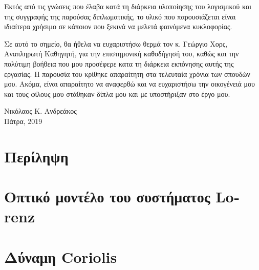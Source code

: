 \documentclass[12pt, a4paper, oneside]{article}
\numberwithin{equation}{subsection}
\def\lat#1{\textlatin{#1}}
\begin{document}
		Εκτός από τις γνώσεις που έλαβα κατά τη διάρκεια υλοποίησης του λογισμικού και της συγγραφής της παρούσας διπλωματικής, το υλικό που παρουσιάζεται είναι ιδιαίτερα χρήσιμο σε κάποιον που ξεκινά να μελετά φαινόμενα κυκλοφορίας.

		Σε αυτό το σημείο, θα ήθελα να ευχαριστήσω θερμά τον κ. Γεώργιο Χορς, Αναπληρωτή Καθηγητή, για την επιστημονική καθοδήγησή του, καθώς και την πολύτιμη βοήθεια που μου προσέφερε κατα τη διάρκεια εκπόνησης αυτής της εργασίας. Η παρουσία του κρίθηκε απαραίτητη στα τελευταία χρόνια των σπουδών μου. Ακόμα, είναι απαραίτητο να αναφερθώ και να ευχαριστήσω την οικογένειά μου και τους φίλους μου στάθηκαν δίπλα μου και με υποστήριξαν στο έργο μου.
		\vspace{15mm}
		\begin{flushright}
			Νικόλαος Κ. Ανδρεάκος\\
			Πάτρα, 2019
		\end{flushright}

		\cleardoublepage

	\section*{Περίληψη}
		\thispagestyle{pagenum}
		\lipsum[10-12]
	\cleardoublepage

	\tableofcontents
		\thispagestyle{pagenum}
	\clearpage

		\listoffigures
		\thispagestyle{pagenum}
	\cleardoublepage

		\listoftables
		\thispagestyle{pagenum}
	\cleardoublepage

		\lstlistoflistings
		\thispagestyle{pagenum}
	\cleardoublepage

	\section{Οπτικό μοντέλο του συστήματος \lat{Lorenz}}
		
	\cleardoublepage
	\section{Δύναμη \lat{Coriolis}}
		
	\cleardoublepage
\end{document}
